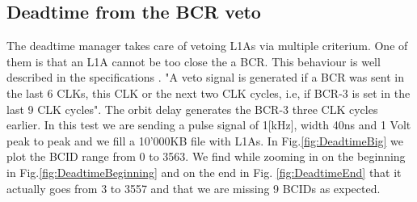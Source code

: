 \subsection{Deadtime from the BCR veto}


The deadtime manager takes care of vetoing L1As via multiple criterium. One of them is that an L1A cannot be too close the a BCR. This behaviour is well described in the specifications \cite{debieux_trigger_2019}. "A veto signal is generated if a BCR was sent in the last 6 CLKs, this CLK or the next two CLK cycles, i.e, if BCR-3 is set in the last 9 CLK cycles". The orbit delay generates the BCR-3 three CLK cycles earlier. In this test we are sending a pulse signal of 1[kHz], width 40ns and 1 Volt peak to peak and we fill a 10'000KB file with L1As. In Fig.\ref{fig:DeadtimeBig} we plot the BCID range from 0 to 3563. We find while zooming in on the beginning in Fig.\ref{fig:DeadtimeBeginning} and on the end in Fig. \ref{fig:DeadtimeEnd} that it actually goes from 3 to 3557 and that we are missing 9 BCIDs as expected.

